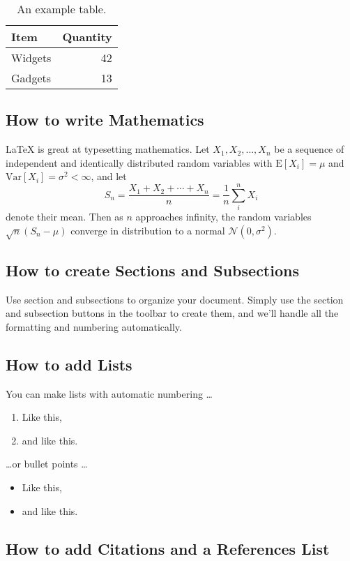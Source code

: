 \documentclass[a4paper]{article}
\begin{document}
\begin{table}
\centering
\begin{tabular}{l|r}
Item & Quantity \\\hline
Widgets & 42 \\
Gadgets & 13
\end{tabular}
\caption{\label{tab:widgets}An example table.}
\end{table}

\subsection{How to write Mathematics}

\LaTeX{} is great at typesetting mathematics. Let $X_1, X_2, \ldots, X_n$ be a sequence of independent and identically distributed random variables with $\text{E}[X_i] = \mu$ and $\text{Var}[X_i] = \sigma^2 < \infty$, and let
\[S_n = \frac{X_1 + X_2 + \cdots + X_n}{n}
      = \frac{1}{n}\sum_{i}^{n} X_i\]
denote their mean. Then as $n$ approaches infinity, the random variables $\sqrt{n}(S_n - \mu)$ converge in distribution to a normal $\mathcal{N}(0, \sigma^2)$.


\subsection{How to create Sections and Subsections}

Use section and subsections to organize your document. Simply use the section and subsection buttons in the toolbar to create them, and we'll handle all the formatting and numbering automatically.

\subsection{How to add Lists}

You can make lists with automatic numbering \dots

\begin{enumerate}
\item Like this,
\item and like this.
\end{enumerate}
\dots or bullet points \dots
\begin{itemize}
\item Like this,
\item and like this.
\end{itemize}

\subsection{How to add Citations and a References List}
\end{document}
